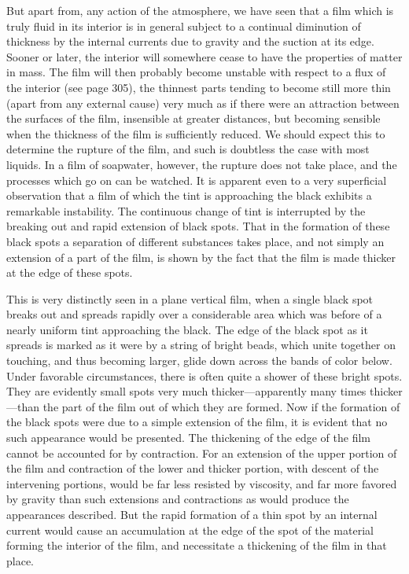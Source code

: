 \documentclass[12pt]{memoir}
\begin{document}
But apart from, any action of the atmosphere, we have seen that a film which is truly fluid in its interior is in general subject to a continual diminution of thickness by the internal currents due to gravity and the suction at its edge. Sooner or later, the interior will somewhere cease to have the properties of matter in mass. The film will then probably become unstable with respect to a flux of the interior (see page 305), the thinnest parts tending to become still more thin (apart from any external cause) very much as if there were an attraction between the surfaces of the film, insensible at greater distances, but becoming sensible when the thickness of the film is sufficiently reduced. %
We should expect this to determine the rupture of the film, and such is doubtless the case with most liquids. In a film of soapwater, however, the rupture does not take place, and the processes which go on can be watched. It is apparent even to a very superficial observation that a film of which the tint is approaching the black exhibits a remarkable instability. The continuous change of tint is interrupted by the breaking out and rapid extension of black spots. That in the formation of these black spots a separation of different substances takes place, and not simply an extension of a part of the film, is shown by the fact that the film is made thicker at the edge of these spots.

This is very distinctly seen in a plane vertical film, when a single black spot breaks out and spreads rapidly over a considerable area which was before of a nearly uniform tint approaching the black. The edge of the black spot as it spreads is marked as it were by a string of bright beads, which unite together on touching, and thus becoming larger, glide down across the bands of color below. Under favorable circumstances, there is often quite a shower of these bright spots. They are evidently small spots very much thicker---apparently many times thicker---than the part of the film out of which they are formed. Now if the formation of the black spots were due to a simple extension of the film, it is evident that no such appearance would be presented. The thickening of the edge of the film cannot be accounted for by contraction. For an extension of the upper portion of the film and contraction of the lower and thicker portion, with descent of the intervening portions, would be far less resisted by viscosity, and far more favored by gravity than such extensions and contractions as would produce the appearances described.  But the rapid formation of a thin spot by an internal current would cause an accumulation at the edge of the spot of the material forming the interior of the film, and necessitate a thickening of the film in that place.
\end{document}

